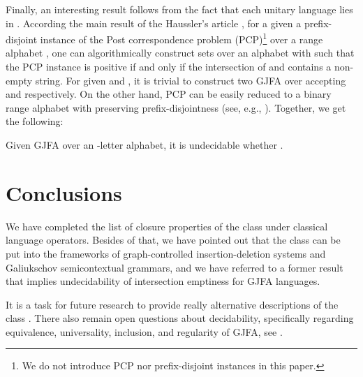 \documentclass{ws-ijmpc}
\begin{document}
Finally, an interesting result follows from the fact that each unitary
language lies in . According the main result of the
Haussler's article \citep{reaHAU1}, for a given a prefix-disjoint
instance of the Post correspondence problem (PCP)\footnote{We do not introduce PCP nor prefix-disjoint instances in this paper.} over a range alphabet , one can algorithmically construct
sets  over an alphabet  with 
such that the PCP instance is positive if and only if the intersection
of  and  contains
a non-empty string. For given  and , it is trivial to construct
two GJFA over  accepting 
and  respectively. On the other hand, PCP can be easily reduced
to a binary range alphabet with preserving prefix-disjointness (see,
e.g., \citep{athSAL1}). Together, we get the following:
\begin{theorem}
Given GJFA  over an -letter alphabet, it is undecidable
whether .
\end{theorem}

\section{Conclusions}

We have completed the list of closure properties of the class 
under classical language operators. Besides of that, we have pointed
out that the class  can be put into the frameworks
of graph-controlled insertion-deletion systems and Galiukschov semicontextual
grammars, and we have referred to a former result that implies undecidability
of intersection emptiness for GJFA languages.

It is a task for future research to provide really alternative descriptions
of the class . There also remain open questions about
decidability, specifically regarding equivalence, universality, inclusion,
and regularity of GJFA, see \citep{athMED1book}.



\end{document}
